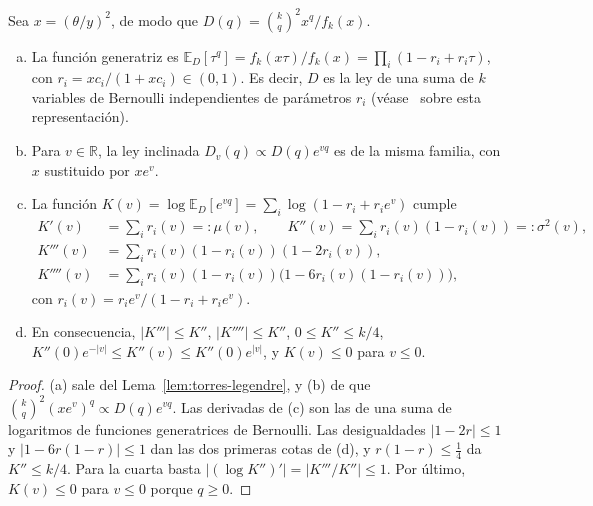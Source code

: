 \begin{corolario}\label{cor:torres-pb}
Sea $x=(\theta/y)^2$, de modo que $D(q)=\binom kq^2x^q/f_k(x)$.
\begin{enumerate}[(a)]
\item La función generatriz es $\mathbb E_D[\tau^q]=f_k(x\tau)/f_k(x)=\prod_i(1-r_i+r_i\tau)$, con
 $r_i=xc_i/(1+xc_i)\in(0,1)$. Es decir, $D$ es la ley de una suma de $k$ variables de Bernoulli
 independientes de parámetros $r_i$ (véase~\cite{Pitman} sobre esta representación).
\item Para $v\in\mathbb R$, la ley inclinada $D_v(q)\propto D(q)e^{vq}$ es de la misma familia, con $x$
 sustituido por $xe^v$.
\item La función $K(v)=\log\mathbb E_D[e^{vq}]=\sum_i\log(1-r_i+r_ie^v)$ cumple
 \[
 \begin{aligned}
  K'(v)&=\sum_ir_i(v)=:\mu(v),\qquad K''(v)=\sum_ir_i(v)(1-r_i(v))=:\sigma^2(v),\\
  K'''(v)&=\sum_ir_i(v)(1-r_i(v))(1-2r_i(v)),\\
  K''''(v)&=\sum_ir_i(v)(1-r_i(v))\bigl(1-6r_i(v)(1-r_i(v))\bigr),
 \end{aligned}
 \]
 con $r_i(v)=r_ie^v/(1-r_i+r_ie^v)$.
\item En consecuencia, $|K'''|\le K''$, $|K''''|\le K''$, $0\le K''\le k/4$,
 $K''(0)e^{-|v|}\le K''(v)\le K''(0)e^{|v|}$, y $K(v)\le0$ para $v\le0$.
\end{enumerate}
\end{corolario}
\begin{proof}
(a) sale del Lema~\ref{lem:torres-legendre}, y (b) de que $\binom kq^2(xe^v)^q\propto D(q)e^{vq}$. Las
derivadas de (c) son las de una suma de logaritmos de funciones generatrices de Bernoulli. Las
desigualdades $|1-2r|\le1$ y $|1-6r(1-r)|\le1$ dan las dos primeras cotas de (d), y $r(1-r)\le\frac14$ da
$K''\le k/4$. Para la cuarta basta $|(\log K'')'|=|K'''/K''|\le1$. Por último, $K(v)\le0$ para $v\le0$
porque $q\ge0$.
\end{proof}

